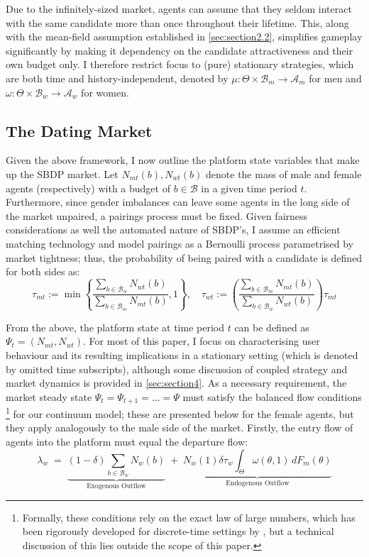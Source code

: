 Due to the infinitely-sized market, agents can assume that they seldom interact with the same candidate more than once throughout their lifetime. This, along with the mean-field assumption established in \autoref{sec:section2.2}, simplifies gameplay significantly by making it dependency on the candidate attractiveness and their own budget only. I therefore restrict focus to (pure) stationary strategies, which are both time and history-independent, denoted by $\mu: \Theta \times\mathcal{B}_m\rightarrow \mathcal{A}_m$ for men and $\omega:\Theta \times\mathcal{B}_w\rightarrow \mathcal{A}_w$ for women.

\subsection{The Dating Market}\label{sec:section2.2}
Given the above framework, I now outline the platform state variables that make up the SBDP market. Let $N_{mt}(b), N_{wt}(b)$ denote the mass of male and female agents (respectively) with a budget of $b\in\mathcal{B}$ in a given time period $t$. Furthermore, since gender imbalances can leave some agents in the long side of the market unpaired, a pairings process must be fixed. Given fairness considerations as well the automated nature of SBDP's, I assume an efficient matching technology and model pairings as a Bernoulli process parametrised by market tightness; thus, the probability of being paired with a candidate is defined for both sides as:  
\begin{equation*}
    \tau_{mt}:=\min \left\{\frac{\sum_{b\in\mathcal{B}_w}N_{wt}(b)}{\sum_{b\in\mathcal{B}_m}N_{mt}(b)} , 1 \right\}, 
    \quad \tau_{wt}:= \left(\frac{\sum_{b\in\mathcal{B}_m}N_{mt}(b)}{\sum_{b\in\mathcal{B}_w}N_{wt}(b)} \right) \tau_{mt} 
\end{equation*}

From the above, the platform state at time period $t$ can be defined as $\Psi_t=(N_{mt},N_{wt})$. 
For most of this paper, I focus on characterising user behaviour and its resulting implications in a stationary setting (which is denoted by omitted time subscripts), although some discussion of coupled strategy and market dynamics is provided in \autoref{sec:section4}. 
As a necessary requirement, the market steady state $\Psi_t=\Psi_{t+1}=...=\Psi$ must satisfy the balanced flow conditions \footnote{Formally, these conditions rely on the exact law of large numbers, which has been rigorously developed for discrete-time settings by \cite{duffie2018dynamic}, but a technical discussion of this lies outside the scope of this paper.} for our continuum model; these are presented below for the female agents, but they apply analogously to the male side of the market. 
Firstly, the entry flow of agents into the platform must equal the departure flow: 
\begin{equation}\label{eq:ss1} 
    \lambda_w\;=\; \underbrace{ (1-\delta)\sum_{b\in\mathcal{B}_w}N_w(b)}_{\text{Exogenous Outflow}} \;+\; \underbrace{N_w(1) \delta \tau_w\int_{\Theta}\omega(\theta,1)\,dF_{m}(\theta)}_{\text{Endogenous Outflow}} 
\end{equation} 

